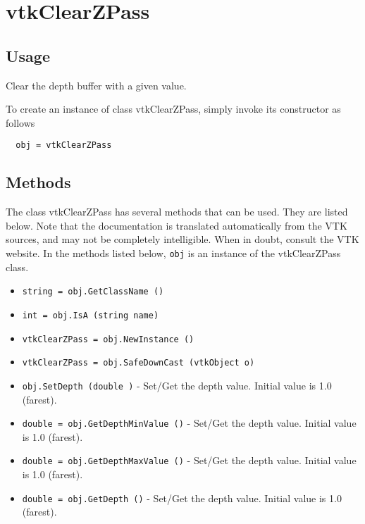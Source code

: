 \section{vtkClearZPass}

\subsection{Usage}

 Clear the depth buffer with a given value.
 

To create an instance of class vtkClearZPass, simply
invoke its constructor as follows
\begin{verbatim}
  obj = vtkClearZPass
\end{verbatim}
\subsection{Methods}

The class vtkClearZPass has several methods that can be used.
  They are listed below.
Note that the documentation is translated automatically from the VTK sources,
and may not be completely intelligible.  When in doubt, consult the VTK website.
In the methods listed below, \verb|obj| is an instance of the vtkClearZPass class.
\begin{itemize}
\item  \verb|string = obj.GetClassName ()|

\item  \verb|int = obj.IsA (string name)|

\item  \verb|vtkClearZPass = obj.NewInstance ()|

\item  \verb|vtkClearZPass = obj.SafeDownCast (vtkObject o)|

\item  \verb|obj.SetDepth (double )| -  Set/Get the depth value. Initial value is 1.0 (farest).

\item  \verb|double = obj.GetDepthMinValue ()| -  Set/Get the depth value. Initial value is 1.0 (farest).

\item  \verb|double = obj.GetDepthMaxValue ()| -  Set/Get the depth value. Initial value is 1.0 (farest).

\item  \verb|double = obj.GetDepth ()| -  Set/Get the depth value. Initial value is 1.0 (farest).

\end{itemize}
